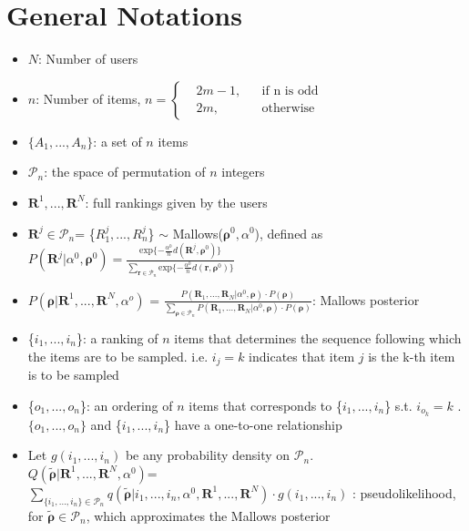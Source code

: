\documentclass[11pt, oneside]{article}   	%
\title{}
\author{}
\date{}							%
\begin{document}
\maketitle 
\section{General Notations}

\begin{itemize}

	\item {$N$: Number of users}
	
	\item {$n$: Number of items,    $
	n = \left \{
	\begin{aligned}
	&2m-1, && \text{if n is odd} \\
	&2m, && \text{otherwise}
	\end{aligned} \right.
	$}
	
	\item {$\{A_1, ..., A_n\}$: a set of $n$ items}
	\item{$\mathcal{P}_n$: the space of permutation of $n$ integers}
	\item {$\bm{R}^1,...,\bm{R}^N$: full rankings given by the users}
	
	
	\item {$\bm{R}^j \in \mathcal{P}_n$= \{$R^j_1,...,R^j_n$\} $\sim$ Mallows($\bm{\rho}^0, \alpha^0$), defined as 
	$P(\bm{R}^j|\alpha^0, \bm{\rho}^0) = \frac{\text{exp}\{-\frac{\alpha^0}{n}d(\bm{R}^j, \bm{\rho}^0)\}}{\sum\limits_{\bm{r}\in \mathcal{P}_n}\text{exp}\{-\frac{\alpha^0}{n}d(\bm{r}, \bm{\rho}^0)\}}$}
	
	
	\item {$P(\bm{\rho}|\bm{R}^1,...,\bm{R}^N,\alpha^o)$ = $\frac{P(\bm{R}_1, ...,\bm{R}_N|\alpha^0, \bm{\rho})\cdot P(\bm{\rho})}{\sum\limits_{\bm{\rho}\in\mathcal{P}_n}P(\bm{R}_1, ...,\bm{R}_N|\alpha^0, \bm{\rho})\cdot P(\bm{\rho})}$: Mallows posterior}
	
	
	\item{\{$i_1, ..., i_n$\}: a ranking of $n$ items that determines the sequence following which the items are to be sampled. i.e. $i_j = k$ indicates that item $j$ is the k-th item is to be sampled}
	
	\item{ \{$o_1, ..., o_n$\}: an ordering of $n$ items that corresponds to \{$i_1, ..., i_n$\} s.t. $i_{o_k} = k$ }. $\{o_1, ...,o_n\}$ and \{$i_1, ..., i_n$\} have a one-to-one relationship
	
	\item {Let $g(i_1, ..., i_n)$ be any probability density on $\mathcal{P}_n$. \\$Q(\tilde{\bm{\rho}}|\bm{R}^1, ..., \bm{R}^N, \alpha^0)$=$\sum\limits_{\{i_1, ..., i_n \}\in \mathcal{P}_n }q(\tilde{\bm{\rho}}|i_1, ..., i_n, \alpha^0, \bm{R}^1, ...,\bm{R}^N) \cdot g(i_1, ..., i_n)$ : pseudolikelihood, for $\tilde{\bm{\rho}} \in \mathcal{P}_n$, which approximates the Mallows posterior}
	

\end{itemize}
\end{document}
